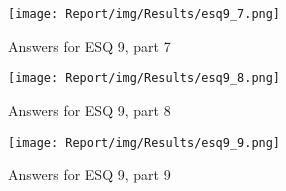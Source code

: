 \documentclass[a4paper,12pt]{article}
\begin{document}
\begin{figure}[ht!]
    \centering
    \texttt{[image: Report/img/Results/esq9\_7.png]}
    \caption{Answers for ESQ 9, part 7}
    \label{fig:res_eduq9_7}
\end{figure}

\begin{figure}[ht!]
    \centering
    \texttt{[image: Report/img/Results/esq9\_8.png]}
    \caption{Answers for ESQ 9, part 8}
    \label{fig:res_eduq9_8}
\end{figure}

\begin{figure}[ht!]
    \centering
    \texttt{[image: Report/img/Results/esq9\_9.png]}
    \caption{Answers for ESQ 9, part 9}
    \label{fig:res_eduq9_9}
\end{figure}
\end{document}
